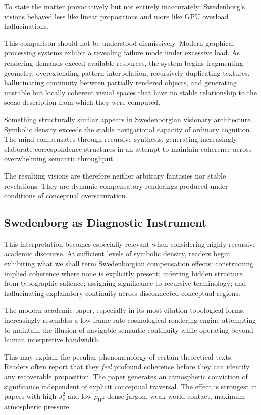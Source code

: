 \documentclass[12pt, a4paper]{article}
\begin{document}
To state the matter provocatively but not entirely inaccurately: Swedenborg's visions behaved less like linear propositions and more like GPU overload hallucinations.

This comparison should not be understood dismissively. Modern graphical processing systems exhibit a revealing failure mode under excessive load. As rendering demands exceed available resources, the system begins fragmenting geometry, overextending pattern interpolation, recursively duplicating textures, hallucinating continuity between partially rendered objects, and generating unstable but locally coherent visual spaces that have no stable relationship to the scene description from which they were computed.

Something structurally similar appears in Swedenborgian visionary architecture. Symbolic density exceeds the stable navigational capacity of ordinary cognition. The mind compensates through recursive synthesis, generating increasingly elaborate correspondence structures in an attempt to maintain coherence across overwhelming semantic throughput.

The resulting visions are therefore neither arbitrary fantasies nor stable revelations. They are dynamic compensatory renderings produced under conditions of conceptual oversaturation.

\subsection{Swedenborg as Diagnostic Instrument}

This interpretation becomes especially relevant when considering highly recursive academic discourse. At sufficient levels of symbolic density, readers begin exhibiting what we shall term Swedenborgian compensation effects: constructing implied coherence where none is explicitly present; inferring hidden structure from typographic salience; assigning significance to recursive terminology; and hallucinating explanatory continuity across disconnected conceptual regions.

The modern academic paper, especially in its most citation-topological forms, increasingly resembles a low-frame-rate cosmological rendering engine attempting to maintain the illusion of navigable semantic continuity while operating beyond human interpretive bandwidth.

This may explain the peculiar phenomenology of certain theoretical texts. Readers often report that they \textit{feel} profound coherence before they can identify any recoverable proposition. The paper generates an atmospheric conviction of significance independent of explicit conceptual traversal. The effect is strongest in papers with high $J_s^2$ and low $\rho_W$: dense jargon, weak world-contact, maximum atmospheric pressure.
\end{document}
